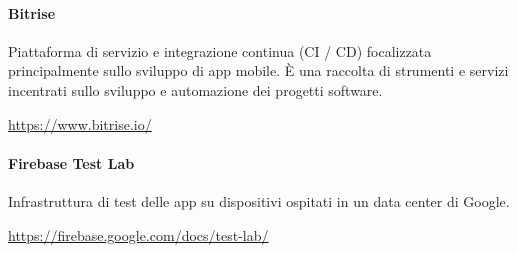 		\paragraph{Bitrise}
		Piattaforma di servizio e integrazione continua (CI / CD) focalizzata principalmente sullo sviluppo di app mobile. È una raccolta di strumenti e servizi incentrati sullo sviluppo e automazione dei progetti software. 
		\newline
		\centerline{\url{https://www.bitrise.io/}}
	\paragraph{Firebase Test Lab}
	Infrastruttura di test delle app su dispositivi ospitati in un data center di Google.
	\newline
		\centerline{\url{https://firebase.google.com/docs/test-lab/}}
	